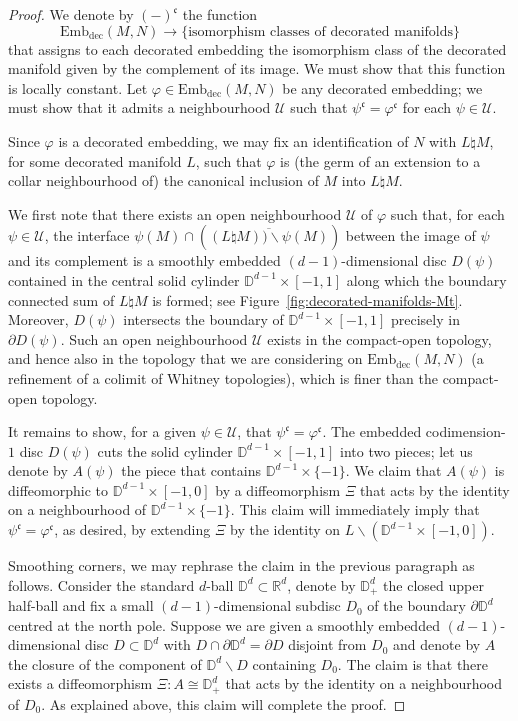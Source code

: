 \documentclass[AHL,Unicode,published]{cedram}
\newcommand{\rdec}{\mathrm{dec}}
\newcommand{\fkc}{\mathfrak{c}}
\newcommand{\cU}{\mathcal{U}}
\newcommand{\bD}{\mathbb{D}}
\newcommand{\bR}{\mathbb{R}}
\newcommand{\too}{\ensuremath{\longrightarrow}}
\newcommand{\embdec}{\ensuremath{\mathrm{Emb}_{\rdec}}}
\begin{document}
\begin{proof}
We denote by $(-)^{\fkc}$ the function
\[
\embdec(M,N) \too \{ \text{isomorphism classes of decorated manifolds} \}
\]
that assigns to each decorated embedding the isomorphism class of the decorated manifold given by the complement of its image. We must show that this function is locally constant. Let $\varphi \in \embdec(M,N)$ be any decorated embedding; we must show that it admits a neighbourhood $\cU$ such that $\psi^{\fkc} = \varphi^{\fkc}$ for each $\psi \in \cU$.

Since $\varphi$ is a decorated embedding, we may fix an identification of $N$ with $L \natural M$, for some decorated manifold $L$, such that $\varphi$ is (the germ of an extension to a collar neighbourhood of) the canonical inclusion of $M$ into $L \natural M$.

We first note that there exists an open neighbourhood $\cU$ of $\varphi$ such that, for each $\psi \in \cU$, the interface $\psi(M) \cap (\overline{(L \natural M)) \smallsetminus \psi(M)})$ between the image of $\psi$ and its complement is a smoothly embedded $(d-1)$-dimensional disc $D(\psi)$ contained in the central solid cylinder $\bD^{d-1} \times [-1,1]$ along which the boundary connected sum of $L \natural M$ is formed; see Figure~\ref{fig:decorated-manifolds-Mt}. Moreover, $D(\psi)$ intersects the boundary of $\bD^{d-1} \times [-1,1]$ precisely in $\partial D(\psi)$. Such an open neighbourhood $\cU$ exists in the compact-open topology, and hence also in the topology that we are considering on $\embdec(M,N)$ (a refinement of a colimit of Whitney topologies), which is finer than the compact-open topology.

It remains to show, for a given $\psi \in \cU$, that $\psi^{\fkc} = \varphi^{\fkc}$. The embedded codimension-$1$ disc $D(\psi)$ cuts the solid cylinder $\bD^{d-1} \times [-1,1]$ into two pieces; let us denote by $A(\psi)$ the piece that contains $\bD^{d-1} \times \{-1\}$. We claim that $A(\psi)$ is diffeomorphic to $\bD^{d-1} \times [-1,0]$ by a diffeomorphism $\Xi$ that acts by the identity on a neighbourhood of $\bD^{d-1} \times \{-1\}$. This claim will immediately imply that $\psi^{\fkc} = \varphi^{\fkc}$, as desired, by extending $\Xi$ by the identity on $L \smallsetminus (\bD^{d-1} \times [-1,0])$.

Smoothing corners, we may rephrase the claim in the previous paragraph as follows. Consider the standard $d$-ball $\bD^d \subset \bR^d$, denote by $\bD^d_+$ the closed upper half-ball and fix a small $(d-1)$-dimensional subdisc $D_0$ of the boundary $\partial \bD^d$ centred at the north pole. Suppose we are given a smoothly embedded $(d-1)$-dimensional disc $D \subset \bD^d$ with $D \cap \partial \bD^d = \partial D$ disjoint from $D_0$ and denote by $A$ the closure of the component of $\bD^d \smallsetminus D$ containing $D_0$. The claim is that there exists a diffeomorphism $\Xi \colon A \cong \bD^d_+$ that acts by the identity on a neighbourhood of $D_0$. As explained above, this claim will complete the proof.


\end{proof}
\end{document}
